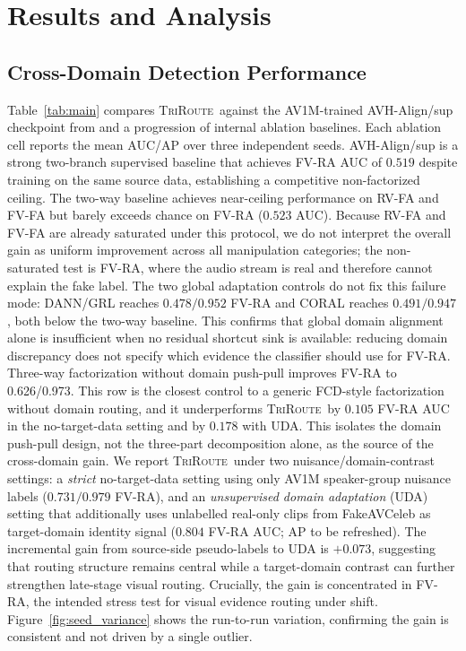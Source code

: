 \documentclass{article}
\newcommand{\method}{\textsc{TriRoute}}
\begin{document}
\section{Results and Analysis}

\subsection{Cross-Domain Detection Performance}

Table~\ref{tab:main} compares \method\ against the AV1M-trained AVH-Align/sup checkpoint from \citet{smeu2025avhalign} and a progression of internal ablation baselines. Each ablation cell reports the mean AUC/AP over three independent seeds. AVH-Align/sup is a strong two-branch supervised baseline that achieves FV-RA AUC of $0.519$ despite training on the same source data, establishing a competitive non-factorized ceiling. The two-way baseline achieves near-ceiling performance on RV-FA and FV-FA but barely exceeds chance on FV-RA ($0.523$ AUC). Because RV-FA and FV-FA are already saturated under this protocol, we do not interpret the overall gain as uniform improvement across all manipulation categories; the non-saturated test is FV-RA, where the audio stream is real and therefore cannot explain the fake label. The two global adaptation controls do not fix this failure mode: DANN/GRL reaches $0.478/0.952$ FV-RA and CORAL reaches $0.491/0.947$, both below the two-way baseline. This confirms that global domain alignment alone is insufficient when no residual shortcut sink is available: reducing domain discrepancy does not specify which evidence the classifier should use for FV-RA. Three-way factorization without domain push-pull improves FV-RA to 0.626/0.973. This row is the closest control to a generic FCD-style factorization without domain routing, and it underperforms \method\ by $0.105$ FV-RA AUC in the no-target-data setting and by $0.178$ with UDA. This isolates the domain push-pull design, not the three-part decomposition alone, as the source of the cross-domain gain. We report \method\ under two nuisance/domain-contrast settings: a \emph{strict} no-target-data setting using only AV1M speaker-group nuisance labels ($0.731/0.979$ FV-RA), and an \emph{unsupervised domain adaptation} (UDA) setting that additionally uses unlabelled real-only clips from FakeAVCeleb as target-domain identity signal ($0.804$ FV-RA AUC; AP to be refreshed). The incremental gain from source-side pseudo-labels to UDA is $+0.073$, suggesting that routing structure remains central while a target-domain contrast can further strengthen late-stage visual routing. Crucially, the gain is concentrated in FV-RA, the intended stress test for visual evidence routing under shift. Figure~\ref{fig:seed_variance} shows the run-to-run variation, confirming the gain is consistent and not driven by a single outlier.
\end{document}
